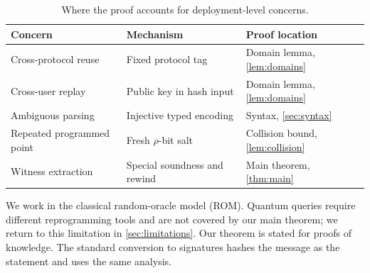 \begin{table}[t]
  \caption{Where the proof accounts for deployment-level concerns.}
  \label{tab:roadmap}
  \centering
  \small
  \begin{tabular}{@{}p{}p{}p{}@{}}
    \toprule
    Concern & Mechanism & Proof location \\
    \midrule
    Cross-protocol reuse & Fixed protocol tag & Domain lemma, \cref{lem:domains} \\
    Cross-user replay & Public key in hash input & Domain lemma, \cref{lem:domains} \\
    Ambiguous parsing & Injective typed encoding & Syntax, \cref{sec:syntax} \\
    Repeated programmed point & Fresh $\rho$-bit salt & Collision bound, \cref{lem:collision} \\
    Witness extraction & Special soundness and rewind & Main theorem, \cref{thm:main} \\
    \bottomrule
  \end{tabular}
\end{table}

 We work in the classical random-oracle model (ROM).  Quantum
queries require different reprogramming tools and are not covered by our main
theorem; we return to this limitation in \cref{sec:limitations}.  Our theorem is
stated for proofs of knowledge.  The standard conversion to signatures hashes
the message as the statement and uses the same analysis.
